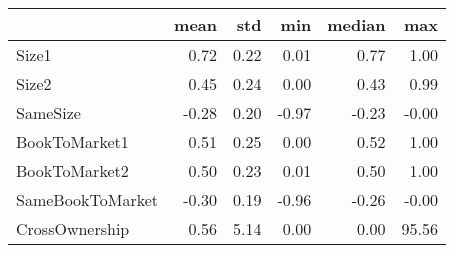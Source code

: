 \begin{tabular}{lrrrrr}
\toprule
{} &  mean &   std &   min &  median &    max \\
\midrule
Size1            &  0.72 &  0.22 &  0.01 &    0.77 &   1.00 \\
Size2            &  0.45 &  0.24 &  0.00 &    0.43 &   0.99 \\
SameSize         & -0.28 &  0.20 & -0.97 &   -0.23 &  -0.00 \\
BookToMarket1    &  0.51 &  0.25 &  0.00 &    0.52 &   1.00 \\
BookToMarket2    &  0.50 &  0.23 &  0.01 &    0.50 &   1.00 \\
SameBookToMarket & -0.30 &  0.19 & -0.96 &   -0.26 &  -0.00 \\
CrossOwnership   &  0.56 &  5.14 &  0.00 &    0.00 &  95.56 \\
\bottomrule
\end{tabular}
